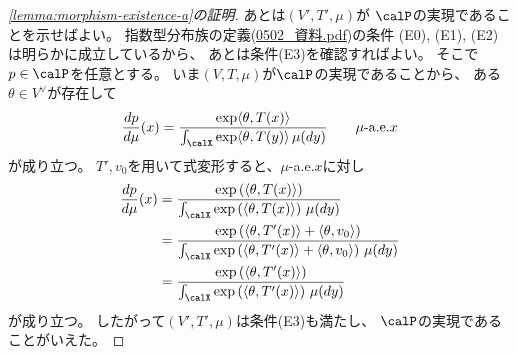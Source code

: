 \documentclass[report]{jlreq}
\begin{document}
\begin{proof}[\cref{lemma:morphism-existence-a}の証明]
    あとは$(V', T', \mu)$が
    $\calP$の実現であることを示せばよい。
    指数型分布族の定義(\url{0502_資料.pdf})の条件
    (E0), (E1), (E2)は明らかに成立しているから、
    あとは条件(E3)を確認すればよい。
    そこで$p \in \calP$を任意とする。
    いま$(V, T, \mu)$が$\calP$の実現であることから、
    ある$\theta \in V^\vee$が存在して
    \begin{equation}
        \dd[p]{\mu}(x)
            = \frac{
                \exp\langle \theta, T(x) \rangle
            }{
                \int_{\calX} \exp\langle \theta, T(y) \rangle \, \mu(dy)
            }
            \qquad
            \text{$\mu$-a.e.$x$}
    \end{equation}
    が成り立つ。
    $T', v_0$を用いて式変形すると、$\mu$-a.e.$x$に対し
    \begin{alignat}{1}
        \dd[p]{\mu}(x)
            &= \frac{
                \exp\myparen{
                    \langle \theta, T(x) \rangle
                }
            }{
                \int_{\calX} \exp\myparen{
                    \langle \theta, T(x) \rangle
                } \, \mu(dy)
            } \\
            &= \frac{
                \exp\myparen{
                    \langle \theta, T'(x) \rangle
                    + \langle \theta, v_0 \rangle
                }
            }{
                \int_{\calX} \exp\myparen{
                    \langle \theta, T'(x) \rangle
                    + \langle \theta, v_0 \rangle
                } \, \mu(dy)
            } \\
            &= \frac{
                \exp\myparen{
                    \langle \theta, T'(x) \rangle
                }
            }{
                \int_{\calX} \exp\myparen{
                    \langle \theta, T'(x) \rangle
                } \, \mu(dy)
            }
    \end{alignat}
    が成り立つ。
    したがって$(V', T', \mu)$は条件(E3)も満たし、
    $\calP$の実現であることがいえた。
\end{proof}
\end{document}
